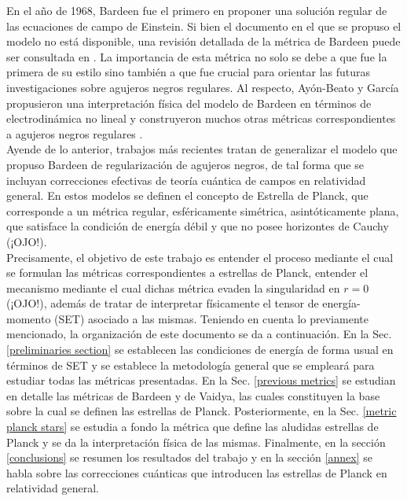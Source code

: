 \documentclass{article}
\numberwithin{equation}{section}
\begin{document}
En el año de 1968, Bardeen fue el primero en proponer una solución regular de las ecuaciones de campo de Einstein. Si bien el documento \cite{bardeen} en el que se propuso el modelo no está disponible, una revisión detallada de la métrica de Bardeen puede ser consultada en \cite{borde1994}. La importancia de esta métrica no solo se debe a que fue la primera de su estilo sino también a que fue crucial para orientar las futuras investigaciones sobre agujeros negros regulares. Al respecto, Ayón-Beato y García propusieron una interpretación física del modelo de Bardeen en términos de electrodinámica no lineal  \cite{ayon-beato2000} y construyeron muchos otras métricas correspondientes a agujeros negros regulares \cite{ayon-beato2005,ayon-beato1999-1,ayon-beato1999-2,ayon-beato1999-3}.\\

Ayende de lo anterior, trabajos más recientes \cite{hayward,lorenzo,rovelli} tratan de generalizar el modelo que propuso Bardeen de regularización de agujeros negros, de tal forma que se incluyan correcciones efectivas de teoría cuántica de campos en relatividad general. En estos modelos se definen el concepto de Estrella de Planck, que corresponde a un métrica regular, esféricamente simétrica, asintóticamente plana, que satisface la condición de energía débil y que no posee horizontes de Cauchy (¡OJO!).\\

Precisamente, el objetivo de este trabajo es entender el proceso mediante el cual se formulan las métricas correspondientes a estrellas de Planck, entender el mecanismo mediante el cual dichas métrica evaden la singularidad en $r = 0$ (¡OJO!), además de tratar de interpretar físicamente el tensor de energía-momento (SET) asociado a las mismas. Teniendo en cuenta lo previamente mencionado, la organización de este documento se da a continuación. En la Sec. \ref{preliminaries section} se establecen las condiciones de energía de forma usual en términos de SET y se establece la metodología general que se empleará para estudiar todas las métricas presentadas. En la Sec. \ref{previous metrics} se estudian en detalle las métricas de Bardeen y de Vaidya, las cuales constituyen la base sobre la cual se definen las estrellas de Planck. Posteriormente, en la Sec. \ref{metric planck stars} se estudia a fondo la métrica que define las aludidas estrellas de Planck y se da la interpretación física de las mismas. Finalmente, en la sección \ref{conclusions} se resumen los resultados del trabajo y en la sección \ref{annex} se habla sobre las correcciones cuánticas que introducen las estrellas de Planck en relatividad general.\\
\end{document}
